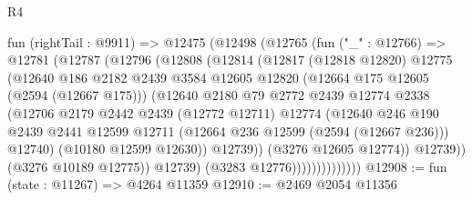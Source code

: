 \begin{lexlean}{R4}
\begin{coremodule}
                      fun (rightTail : @9911) =>
                      @12475
                        (@12498
                          (@12765
                            (fun ("_" : @12766) =>
                            @12781
                              (@12787
                                (@12796
                                  (@12808
                                    (@12814
                                      (@12817
                                        (@12818 @12820)
                                        @12775
                                        (@12640
                                          @186
                                          @2182
                                          @2439
                                          @3584
                                          @12605
                                          @12820
                                          (@12664 @175 @12605 (@2594 (@12667 @175)))
                                          (@12640
                                            @2180
                                            @79
                                            @2772
                                            @2439
                                            @12774
                                            @2338
                                            (@12706
                                              @2179
                                              @2442
                                              @2439
                                              (@12772 @12711)
                                              @12774
                                              (@12640
                                                @246
                                                @190
                                                @2439
                                                @2441
                                                @12599
                                                @12711
                                                (@12664 @236 @12599 (@2594 (@12667 @236)))
                                                @12740)
                                              (@10180 @12599 @12630))
                                            @12739))
                                        (@3276 @12605 @12774))
                                      @12739))
                                  (@3276 @10189 @12775))
                                @12739)
                              (@3283 @12776))))))))))))))
@12908 := fun (state : @11267) => @4264 @11359
@12910 := @2469 @2054 @11356

\end{coremodule}
\end{lexlean}

